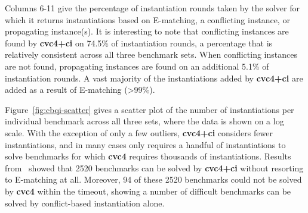 \documentclass[oribibl]{llncs}
\begin{document}
Columns 6-11 give the percentage of instantiation rounds taken by the solver 
for which it returns instantiations based on E-matching, a conflicting instance,
or propagating instance(s).
It is interesting to note that conflicting instances are found by {\bf cvc4+ci} on
74.5\% of instantiation rounds, a percentage that is relatively consistent across all three benchmark sets.
When conflicting instances are not found, propagating instances are found on an additional 5.1\% of instantiation rounds.
A vast majority of the instantiations added by {\bf cvc4+ci} are added as a result of E-matching (>99\%).

Figure~\ref{fig:cbqi-scatter} gives a scatter plot of the number of instantiations per individual benchmark
across all three sets, where the data is shown on a log scale.
With the exception of only a few outliers, {\bf cvc4+ci} considers fewer instantiations,
and in many cases only requires a handful of instantiations to solve benchmarks for which {\bf cvc4}
requires thousands of instantiations.
Results from~\cite{ReynoldsTinelliMoura14} showed that 2520 benchmarks can be solved by {\bf cvc4+ci}
without resorting to E-matching at all.
Moreover, 94 of these 2520 benchmarks could not be solved by {\bf cvc4} within the timeout,
showing a number of difficult benchmarks can be solved by conflict-based instantiation alone.
\end{document}
